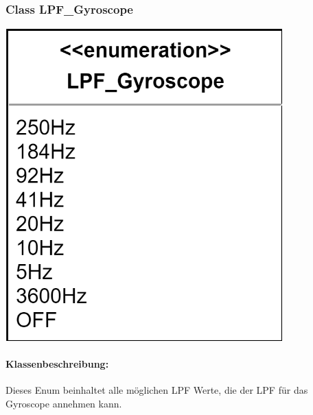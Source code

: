 \documentclass[a4paper,12pt]{article}
\begin{document}
\begin{minipage}[b]{0.5\textwidth}
	\subsubsection{Class LPF\_Gyroscope}
	
	\end{minipage}
	\begin{minipage}[c]{0.5\textwidth}
	\includegraphics[width=0.8\textwidth]{bilder/BibPackageKlassen/LPF_Gyrosope.png}
\end{minipage}

\paragraph{Klassenbeschreibung:}
Dieses Enum beinhaltet alle möglichen LPF Werte, die der LPF für das Gyroscope annehmen kann.
\end{document}

